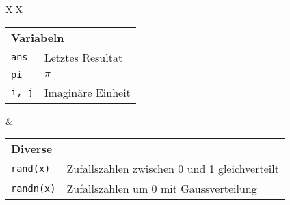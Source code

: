 \begin{tabularx}{\textwidth}{X|X}
\\
  \begin{tabular}{ll}
    \multicolumn{2}{l}{\textbf{Variabeln}}
    \\
      \texttt{ans}      & Letztes Resultat
    \\
      \texttt{pi}       & $\pi$
    \\
      \texttt{i, j}     & Imaginäre Einheit
  \end{tabular}
  
  & %
  \begin{tabular}{ll}
    \multicolumn{2}{l}{\textbf{Diverse}}
    \\
      \texttt{rand(x)}     & Zufallszahlen zwischen 0 und 1 gleichverteilt
    \\
      \texttt{randn(x)}    & Zufallszahlen um 0 mit Gaussverteilung
  \end{tabular}
  
\end{tabularx}